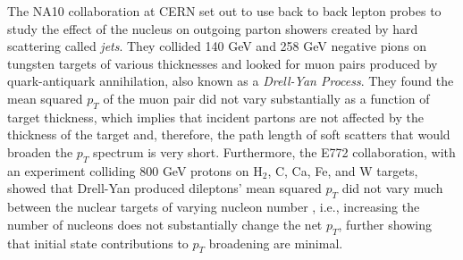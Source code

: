 The NA10 collaboration at CERN set out to use back to back lepton probes to study the effect of the nucleus on outgoing parton showers created by hard scattering called \textit{jets}. They collided 140 GeV and 258 GeV negative pions on tungsten targets of various thicknesses and looked for muon pairs produced by quark-antiquark annihilation, also known as a \textit{Drell-Yan Process}.
They found the mean squared $p_{T}$ of the muon pair did not vary substantially as a function of target thickness, which implies that incident partons are not affected by the thickness of the target and, therefore, the path length of soft scatters that would broaden the $p_{T}$ spectrum is very short. Furthermore, the E772 collaboration, with an experiment colliding 800 GeV protons on H$_{2}$, C, Ca, Fe, and W targets, showed that Drell-Yan produced dileptons’ mean squared $p_{T}$ did not vary much between the nuclear targets of varying nucleon number \citep{PhysRevLett.66.2285}, i.e., increasing the number of nucleons does not substantially change the net $p_{T}$, further showing that initial state contributions to $p_{T}$ broadening are minimal.

